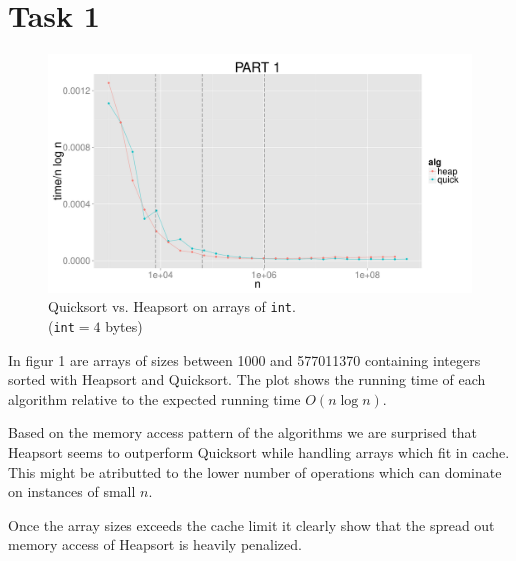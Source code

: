 \documentclass{article}
\begin{document}
\section*{Task 1}
\begin{figure}[H]
    \centering
    \includegraphics[width=
    \textwidth]{images/part1.pdf}
    \caption{Quicksort vs. Heapsort on arrays of \texttt{int}. 
    \\(\texttt{int}$= 4$ bytes)}
\end{figure}
In figur 1 are arrays of sizes between 1000 and 577011370 containing integers 
sorted with Heapsort and Quicksort. The plot shows the running time of each 
algorithm relative to the expected running time $O(n \log n)$. 

Based on the memory access pattern of the algorithms we are surprised that 
Heapsort seems to outperform Quicksort while handling arrays which fit in cache. 
This might be atributted to the lower number of operations which can dominate on 
instances of small $n$.

Once the array sizes exceeds the cache limit it clearly show that the spread out
memory access of Heapsort is heavily penalized.
\newpage
\end{document}
